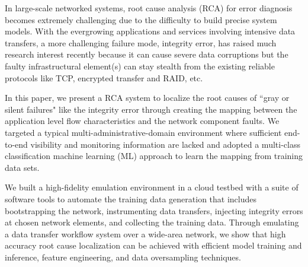 In large-scale networked systems, root cause analysis (RCA) for error diagnosis 
becomes extremely challenging due to the difficulty to build precise system models.
With the evergrowing applications and services involving intensive data transfers, 
a more challenging failure mode, integrity error, has raised much research interest recently 
because it can cause severe data corruptions but the faulty infrastructural element(s) 
can stay stealth from the existing reliable protocols like TCP, encrypted transfer and RAID, etc.

In this paper, we present a RCA system to localize the root causes of ``gray or silent failures" like the integrity error through creating the mapping between the application 
level flow characteristics and the network component faults. We targeted a typical multi-administrative-domain environment where sufficient end-to-end visibility 
and monitoring information are lacked and adopted a multi-class classification machine learning (ML) approach to learn the mapping from training data sets. 

We built a high-fidelity emulation environment in a cloud testbed with a suite of software tools to automate the training data generation that includes bootstrapping the network, 
instrumenting data transfers, injecting integrity errors at chosen network elements, and collecting the training data. Through emulating a data transfer workflow system over a wide-area network, 
we show that high accuracy root cause localization can be achieved with efficient model training and inference, feature engineering, and data oversampling techniques.
